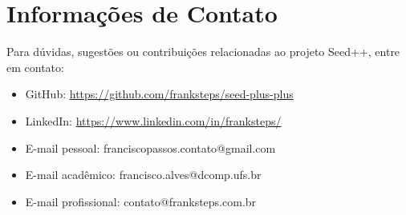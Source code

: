 \documentclass[a4paper,12pt]{article}
\begin{document}
\section{Informações de Contato}

Para dúvidas, sugestões ou contribuições relacionadas ao projeto Seed++, entre em contato:

\begin{itemize}
    \item GitHub: \url{https://github.com/franksteps/seed-plus-plus}
    \item LinkedIn: \url{https://www.linkedin.com/in/franksteps/}
    \item E-mail pessoal: franciscopassos.contato@gmail.com
    \item E-mail acadêmico: francisco.alves@dcomp.ufs.br
    \item E-mail profissional: contato@franksteps.com.br
\end{itemize}
\end{document}
